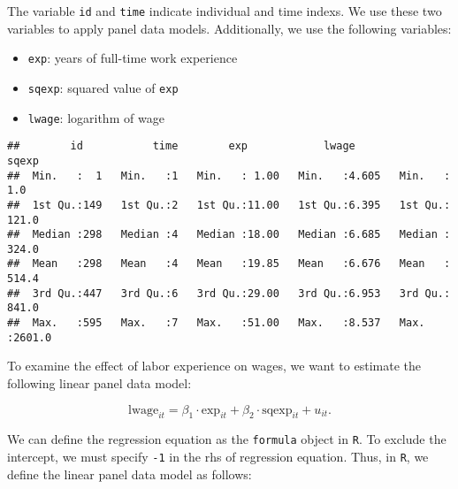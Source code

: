 \documentclass[
  12pt,
]{article}
\newenvironment{Shaded}{\begin{snugshade}}{\end{snugshade}}
\newcommand{\DecValTok}[1]{\textcolor[rgb]{0.00,0.00,0.81}{#1}}
\newcommand{\KeywordTok}[1]{\textcolor[rgb]{0.13,0.29,0.53}{\textbf{#1}}}
\newcommand{\NormalTok}[1]{#1}
\newcommand{\OperatorTok}[1]{\textcolor[rgb]{0.81,0.36,0.00}{\textbf{#1}}}
\newcommand{\StringTok}[1]{\textcolor[rgb]{0.31,0.60,0.02}{#1}}
\providecommand{\tightlist}{%
  \setlength{\itemsep}{0pt}\setlength{\parskip}{0pt}}
\begin{document}
The variable \texttt{id} and \texttt{time} indicate individual and time
indexs. We use these two variables to apply panel data models.
Additionally, we use the following variables:

\begin{itemize}
\tightlist
\item
  \texttt{exp}: years of full-time work experience
\item
  \texttt{sqexp}: squared value of \texttt{exp}
\item
  \texttt{lwage}: logarithm of wage
\end{itemize}

\begin{Shaded}
\end{Shaded}

\begin{verbatim}
##        id           time        exp            lwage           sqexp       
##  Min.   :  1   Min.   :1   Min.   : 1.00   Min.   :4.605   Min.   :   1.0  
##  1st Qu.:149   1st Qu.:2   1st Qu.:11.00   1st Qu.:6.395   1st Qu.: 121.0  
##  Median :298   Median :4   Median :18.00   Median :6.685   Median : 324.0  
##  Mean   :298   Mean   :4   Mean   :19.85   Mean   :6.676   Mean   : 514.4  
##  3rd Qu.:447   3rd Qu.:6   3rd Qu.:29.00   3rd Qu.:6.953   3rd Qu.: 841.0  
##  Max.   :595   Max.   :7   Max.   :51.00   Max.   :8.537   Max.   :2601.0
\end{verbatim}

To examine the effect of labor experience on wages, we want to estimate
the following linear panel data model:

\[
  \text{lwage}_{it} = 
  \beta_1 \cdot \text{exp}_{it} +
  \beta_2 \cdot \text{sqexp}_{it} + 
  u_{it}.
\]

We can define the regression equation as the \texttt{formula} object in
\texttt{R}. To exclude the intercept, we must specify \texttt{-1} in the
rhs of regression equation. Thus, in \texttt{R}, we define the linear
panel data model as follows:
\end{document}
